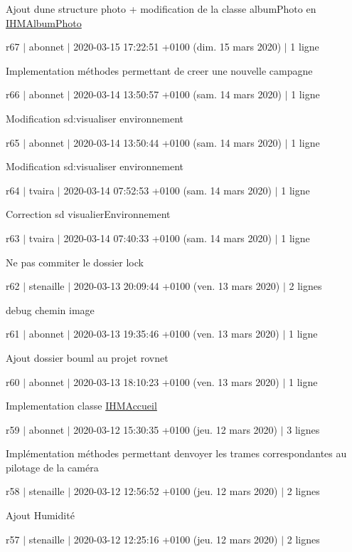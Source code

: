 Ajout d\textquotesingle{}une structure photo + modification de la classe album\+Photo en \hyperlink{class_i_h_m_album_photo}{I\+H\+M\+Album\+Photo}

r67 $\vert$ abonnet $\vert$ 2020-\/03-\/15 17\+:22\+:51 +0100 (dim. 15 mars 2020) $\vert$ 1 ligne

Implementation méthodes permettant de creer une nouvelle campagne

r66 $\vert$ abonnet $\vert$ 2020-\/03-\/14 13\+:50\+:57 +0100 (sam. 14 mars 2020) $\vert$ 1 ligne

Modification sd\+:visualiser environnement

r65 $\vert$ abonnet $\vert$ 2020-\/03-\/14 13\+:50\+:44 +0100 (sam. 14 mars 2020) $\vert$ 1 ligne

Modification sd\+:visualiser environnement

r64 $\vert$ tvaira $\vert$ 2020-\/03-\/14 07\+:52\+:53 +0100 (sam. 14 mars 2020) $\vert$ 1 ligne

Correction sd visualier\+Environnement

r63 $\vert$ tvaira $\vert$ 2020-\/03-\/14 07\+:40\+:33 +0100 (sam. 14 mars 2020) $\vert$ 1 ligne

Ne pas commiter le dossier lock

r62 $\vert$ stenaille $\vert$ 2020-\/03-\/13 20\+:09\+:44 +0100 (ven. 13 mars 2020) $\vert$ 2 lignes

debug chemin image

r61 $\vert$ abonnet $\vert$ 2020-\/03-\/13 19\+:35\+:46 +0100 (ven. 13 mars 2020) $\vert$ 1 ligne

Ajout dossier bouml au projet rovnet

r60 $\vert$ abonnet $\vert$ 2020-\/03-\/13 18\+:10\+:23 +0100 (ven. 13 mars 2020) $\vert$ 1 ligne

Implementation classe \hyperlink{class_i_h_m_accueil}{I\+H\+M\+Accueil}

r59 $\vert$ abonnet $\vert$ 2020-\/03-\/12 15\+:30\+:35 +0100 (jeu. 12 mars 2020) $\vert$ 3 lignes

Implémentation méthodes permettant d\textquotesingle{}envoyer les trames correspondantes au pilotage de la caméra

r58 $\vert$ stenaille $\vert$ 2020-\/03-\/12 12\+:56\+:52 +0100 (jeu. 12 mars 2020) $\vert$ 2 lignes

Ajout Humidité

r57 $\vert$ stenaille $\vert$ 2020-\/03-\/12 12\+:25\+:16 +0100 (jeu. 12 mars 2020) $\vert$ 2 lignes

